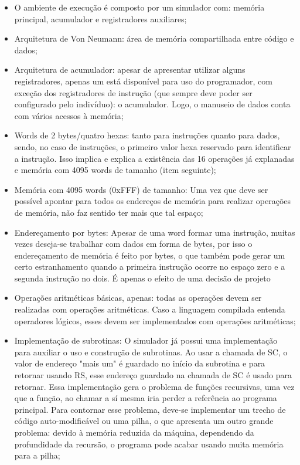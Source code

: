 \begin{itemize}
  \item{O ambiente de execução é composto por um simulador com: memória principal, acumulador e registradores auxiliares;}

  \item{Arquitetura de Von Neumann: área de memória compartilhada entre código e dados;}

  \item{Arquitetura de acumulador: apesar de apresentar utilizar alguns registradores, apenas um está disponível para uso do programador, com exceção dos registradores de instrução (que sempre deve poder ser configurado pelo indivíduo): o acumulador. Logo, o manuseio de dados conta com vários acessos à memória;}
  
  \item{Words de 2 bytes/quatro hexas: tanto para instruções quanto para dados, sendo, no caso de instruções, o primeiro valor hexa reservado para identificar a instrução. Isso implica e explica a existência das 16 operações já explanadas e memória com 4095 words de tamanho (item seguinte);}
  
  \item{Memória com 4095 words (0xFFF) de tamanho: Uma vez que deve ser possível apontar para todos os endereços de memória para realizar operações de memória, não faz sentido ter mais que tal espaço;}
  
  \item{Endereçamento por bytes: Apesar de uma word formar uma instrução, muitas vezes deseja-se trabalhar com dados em forma de bytes, por isso o endereçamento de memória é feito por bytes, o que também pode gerar um certo estranhamento quando a primeira instrução ocorre no espaço zero e a segunda instrução no dois. É apenas o efeito de uma decisão de projeto}
  
  \item{Operações aritméticas básicas, apenas: todas as operações devem ser realizadas com operações aritméticas. Caso a linguagem compilada entenda operadores lógicos, esses devem ser implementados com operações  aritméticas;}
  
  \item{Implementação de subrotinas: O simulador já possui uma implementação para auxiliar o uso e construção de subrotinas. Ao usar a chamada de SC, o valor de endereço "mais um" é guardado no início da subrotina e para retornar usando RS, esse endereço guardado na chamada de SC é usado para retornar. Essa implementação gera o problema de funções recursivas, uma vez que a função, ao chamar a sí mesma iria perder a referência ao programa principal. Para contornar esse problema, deve-se implementar um trecho de código auto-modificável ou uma pilha, o que apresenta um outro grande problema: devido à memória reduzida da máquina, dependendo da profundidade da recursão, o programa pode acabar usando muita memória para a pilha;}
  

\end{itemize}
